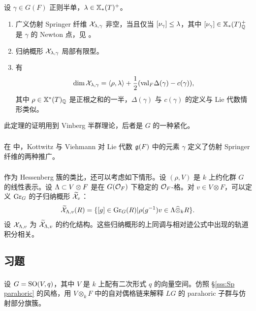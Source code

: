 \begin{theorem} 设 $\gamma\in G(F)$ 正则半单，$\lambda\in\mathbb{X}_*(T)^{+}$。
\begin{enumerate}
\item 广义仿射 Springer 纤维 $\mathcal{X}_{\lambda,\gamma}$ 非空，当且仅当 $[\nu_{\gamma}]\leq\lambda$，其中 $[\nu_{\gamma}]\in\mathbb{X}_*(T)^{+}_{\mathbb{Q}}$ 是 $\gamma$ 的 Newton 点，见 \cite[\S2]{KV}。
\item 归纳概形 $\mathcal{X}_{\lambda,\gamma}$ 局部有限型。
\item 有
\begin{equation*}
\dim\mathcal{X}_{\lambda,\gamma}=\langle{\rho,\lambda}\rangle+\frac{1}{2}(\textup{val}_{F}\Delta(\gamma)-c(\gamma)),
\end{equation*}
其中 $\rho\in\mathbb{X}^*(T)_{\mathbb{Q}}$ 是正根之和的一半，$\Delta(\gamma)$ 与 $c(\gamma)$ 的定义与 Lie 代数情形类似。
\end{enumerate}
\end{theorem}
此定理的证明用到 Vinberg 半群理论，后者是 $G$ 的一种紧化。

\subsubsection{} 在 \cite{KV} 中，Kottwitz 与 Viehmann 对 Lie 代数 $\mathfrak{g}(F)$ 中的元素 $\gamma$ 定义了仿射 Springer 纤维的两种推广。

\subsubsection{} 作为 Hessenberg 簇的类比，还可以考虑如下情形。设 $(\rho,V)$ 是 $k$ 上约化群 $G$ 的线性表示。设 $\Lambda\subset V\otimes F$ 是在 $G(\mathcal{O}_{F})$ 下稳定的 $\mathcal{O}_{F}$-格。对 $v\in V\otimes F$，可以定义 $\textup{Gr}_{G}$ 的子归纳概形 $\widetilde{\mathcal{X}}_{v}$：
\begin{equation*}
\widetilde{\mathcal{X}}_{\Lambda, v}(R)=\{[g]\in\textup{Gr}_{G}(R)|\rho(g^{-1})v\in\Lambda\widehat{\otimes}_{k}R\}.
\end{equation*}
设 $\mathcal{X}_{\Lambda,v}$ 为 $\widetilde{\mathcal{X}}_{\Lambda,v}$ 的约化结构。这些归纳概形的上同调与相对迹公式中出现的轨道积分相关。

\subsection{习题}

\subsubsection{}\label{exII:SO parahoric} 设 $G=\textup{SO}(V,q)$，其中 $V$ 是 $k$ 上配有二次形式 $q$ 的向量空间。仿照 \S\ref{sss:Sp parahoric} 的风格，用 $V\otimes_{k}F$ 中的自对偶格链来解释 $LG$ 的 parahoric 子群与仿射部分旗簇。


